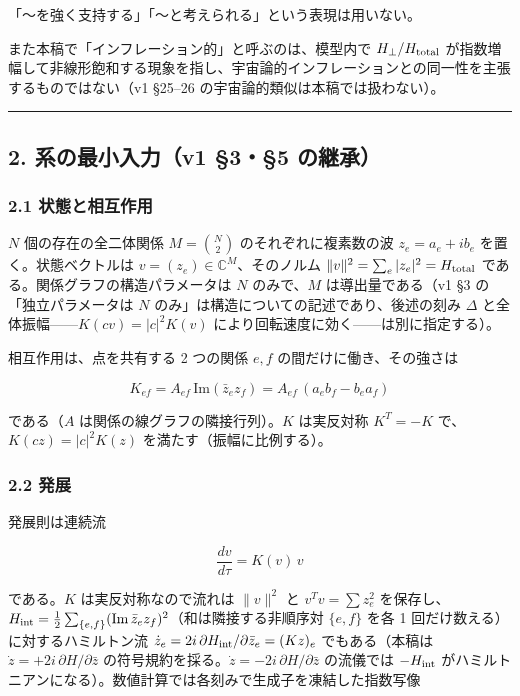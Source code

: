 \documentclass[
  10pt,
  a4paper,
]{ltjsarticle}
\begin{document}
「〜を強く支持する」「〜と考えられる」という表現は用いない。

また本稿で「インフレーション的」と呼ぶのは、模型内で
\(H_\perp/H_{\rm total}\)
が指数増幅して非線形飽和する現象を指し、宇宙論的インフレーションとの同一性を主張するものではない（v1
§25--26 の宇宙論的類似は本稿では扱わない）。

\begin{center}\rule{0.5\linewidth}{0.5pt}\end{center}

\subsection{2. 系の最小入力（v1 §3・§5
の継承）}\label{ux7cfbux306eux6700ux5c0fux5165ux529bv1-35-ux306eux7d99ux627f}

\subsubsection{2.1
状態と相互作用}\label{ux72b6ux614bux3068ux76f8ux4e92ux4f5cux7528}

\(N\) 個の存在の全二体関係 \(M=\binom N2\) のそれぞれに複素数の波
\(z_e=a_e+ib_e\) を置く。状態ベクトルは
\(v=(z_e)\in\mathbb C^M\)、そのノルム
\(\|v\|^2=\sum_e|z_e|^2=H_{\rm total}\)
である。関係グラフの構造パラメータは \(N\) のみで、\(M\)
は導出量である（v1 §3 の「独立パラメータは \(N\)
のみ」は構造についての記述であり、後述の刻み \(\Delta\)
と全体振幅------\(K(cv)=|c|^2K(v)\)
により回転速度に効く------は別に指定する）。

相互作用は、点を共有する 2 つの関係 \(e,f\) の間だけに働き、その強さは

\[
K_{ef}=A_{ef}\,\mathrm{Im}(\bar z_e z_f)=A_{ef}\,(a_eb_f-b_ea_f)
\]

である（\(A\) は関係の線グラフの隣接行列）。\(K\) は実反対称 \(K^T=-K\)
で、\(K(cz)=|c|^2K(z)\) を満たす（振幅に比例する）。

\subsubsection{2.2 発展}\label{ux767aux5c55}

発展則は連続流

\[
\frac{dv}{d\tau}=K(v)\,v
\]

である。\(K\) は実反対称なので流れは \(\|v\|^2\) と \(v^Tv=\sum z_e^2\)
を保存し、\(H_{\rm int}=\tfrac12\sum_{\{e,f\}}(\mathrm{Im}\,\bar z_ez_f)^2\)（和は隣接する非順序対
\(\{e,f\}\) を各 1 回だけ数える）に対するハミルトン流
\(\dot z_e=2i\,\partial H_{\rm int}/\partial\bar z_e=(Kz)_e\)
でもある（本稿は \(\dot z=+2i\,\partial H/\partial\bar z\)
の符号規約を採る。\(\dot z=-2i\,\partial H/\partial\bar z\) の流儀では
\(-H_{\rm int}\)
がハミルトニアンになる）。数値計算では各刻みで生成子を凍結した指数写像
\end{document}
